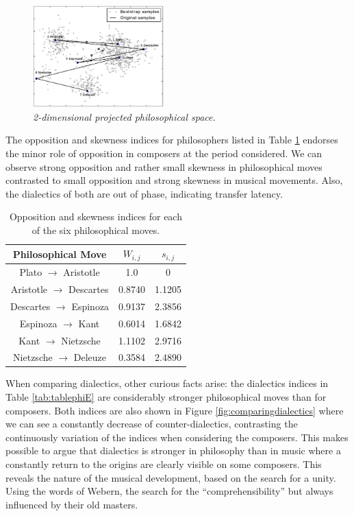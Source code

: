 \documentclass[
 aip,
 jmp,
 amsmath,amssymb,
 reprint,
]{revtex4-1}
\begin{document}
\begin{figure}
  \begin{center}
    \includegraphics[width=0.45\textwidth]{g1filosofos}
  \end{center}
  \caption{\it 2-dimensional projected philosophical space.}
  \label{fig:phipca}
\end{figure}

The opposition and skewness indices for philosophers listed in Table
\ref{tab:tablephiOI} endorses the minor role of opposition in
composers at the period considered. We can observe strong opposition and rather small skewness 
in philosophical moves contrasted to small opposition and strong skewness in
musical movements. Also, the dialectics of both are out of
phase, indicating transfer latency. 

\begin{table}%
\caption{\label{tab:tablephiOI}Opposition and skewness indices for each
of the six philosophical moves.}

\begin{tabular}{|c||c|c|}
\hline
Philosophical Move & $W_{i,j}$ & $s_{i,j}$ \\
\hline \hline
Plato $\rightarrow$ Aristotle     & 1.0    & 0 \\
Aristotle $\rightarrow$ Descartes & 0.8740 & 1.1205 \\
Descartes $\rightarrow$ Espinoza  & 0.9137 & 2.3856 \\
Espinoza $\rightarrow$ Kant       & 0.6014 & 1.6842 \\
Kant $\rightarrow$ Nietzsche      & 1.1102 & 2.9716 \\
Nietzsche $\rightarrow$ Deleuze   & 0.3584 & 2.4890 \\
\hline
\end{tabular}
\end{table}

When comparing dialectics, other curious facts arise: the dialectics
indices in Table \ref{tab:tablephiE} are considerably stronger philosophical moves than for
composers. Both indices are also shown in Figure
\ref{fig:comparingdialectics} where we can see a constantly decrease
of counter-dialectics, contrasting the continuously variation of the
indices when considering the composers. This makes possible to argue
that dialectics is stronger in philosophy than in music where a
constantly return to the origins are clearly visible on some
composers. This reveals the nature of the
musical development, based on the search for a unity. Using the words
of Webern, the search for the ``comprehensibility'' but always
influenced by their old masters.
\end{document}
